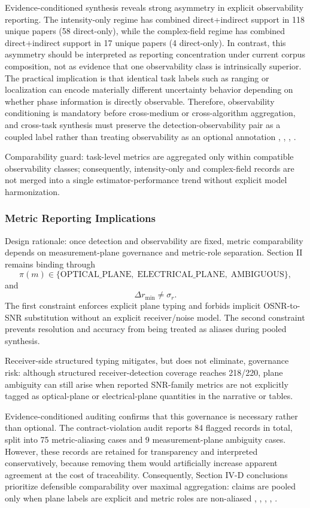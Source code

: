 Evidence-conditioned synthesis reveals strong asymmetry in explicit observability reporting. The intensity-only regime has combined direct+indirect support in 118 unique papers (58 direct-only), while the complex-field regime has combined direct+indirect support in 17 unique papers (4 direct-only). In contrast, this asymmetry should be interpreted as reporting concentration under current corpus composition, not as evidence that one observability class is intrinsically superior. The practical implication is that identical task labels such as ranging or localization can encode materially different uncertainty behavior depending on whether phase information is directly observable. Therefore, observability conditioning is mandatory before cross-medium or cross-algorithm aggregation, and cross-task synthesis must preserve the detection-observability pair as a coupled label rather than treating observability as an optional annotation \cite{O_ISAC_021}, \cite{O_ISAC_082}, \cite{O_ISAC_039}, \cite{O_ISAC_056}.

Comparability guard: task-level metrics are aggregated only within compatible observability classes; consequently, intensity-only and complex-field records are not merged into a single estimator-performance trend without explicit model harmonization.

\subsubsection{Metric Reporting Implications}
Design rationale: once detection and observability are fixed, metric comparability depends on measurement-plane governance and metric-role separation. Section II remains binding through
\[
\pi(m)\in\{\text{OPTICAL\_PLANE},\;\text{ELECTRICAL\_PLANE},\;\text{AMBIGUOUS}\},
\]
and
\[
\Delta r_{\min}\neq \sigma_r.
\]
The first constraint enforces explicit plane typing and forbids implicit OSNR-to-SNR substitution without an explicit receiver/noise model. The second constraint prevents resolution and accuracy from being treated as aliases during pooled synthesis.

Receiver-side structured typing mitigates, but does not eliminate, governance risk: although structured receiver-detection coverage reaches 218/220, plane ambiguity can still arise when reported SNR-family metrics are not explicitly tagged as optical-plane or electrical-plane quantities in the narrative or tables.

Evidence-conditioned auditing confirms that this governance is necessary rather than optional. The contract-violation audit reports 84 flagged records in total, split into 75 metric-aliasing cases and 9 measurement-plane ambiguity cases. However, these records are retained for transparency and interpreted conservatively, because removing them would artificially increase apparent agreement at the cost of traceability. Consequently, Section IV-D conclusions prioritize defensible comparability over maximal aggregation: claims are pooled only when plane labels are explicit and metric roles are non-aliased \cite{O_ISAC_132}, \cite{O_ISAC_061}, \cite{O_ISAC_013}, \cite{O_ISAC_050}, \cite{O_ISAC_056}.

